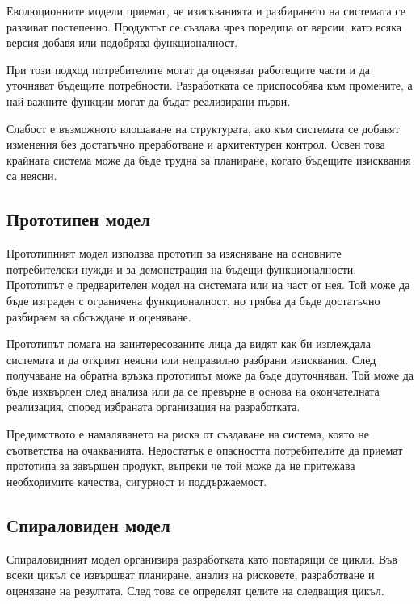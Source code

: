 \begin{defn}
Еволюционните модели приемат, че изискванията и разбирането на системата се развиват постепенно. Продуктът се създава чрез поредица от версии, като всяка версия добавя или подобрява функционалност.
\end{defn}

При този подход потребителите могат да оценяват работещите части и да уточняват бъдещите потребности. Разработката се приспособява към промените, а най-важните функции могат да бъдат реализирани първи.

Слабост е възможното влошаване на структурата, ако към системата се добавят изменения без достатъчно преработване и архитектурен контрол. Освен това крайната система може да бъде трудна за планиране, когато бъдещите изисквания са неясни.

\subsection{Прототипен модел}\label{s:26.3.4}

\begin{defn}
Прототипният модел използва прототип за изясняване на основните потребителски нужди и за демонстрация на бъдещи функционалности. Прототипът е предварителен модел на системата или на част от нея. Той може да бъде изграден с ограничена функционалност, но трябва да бъде достатъчно разбираем за обсъждане и оценяване.
\end{defn}

Прототипът помага на заинтересованите лица да видят как би изглеждала системата и да открият неясни или неправилно разбрани изисквания. След получаване на обратна връзка прототипът може да бъде доуточняван. Той може да бъде изхвърлен след анализа или да се превърне в основа на окончателната реализация, според избраната организация на разработката.

Предимството е намаляването на риска от създаване на система, която не съответства на очакванията. Недостатък е опасността потребителите да приемат прототипа за завършен продукт, въпреки че той може да не притежава необходимите качества, сигурност и поддържаемост.

\subsection{Спираловиден модел}\label{s:26.3.5}

\begin{defn}
Спираловидният модел организира разработката като повтарящи се цикли. Във всеки цикъл се извършват планиране, анализ на рисковете, разработване и оценяване на резултата. След това се определят целите на следващия цикъл.
\end{defn}

